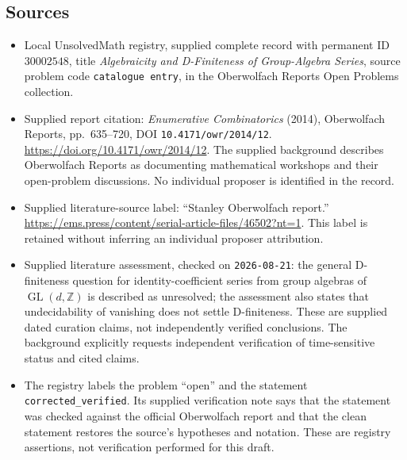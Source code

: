 \documentclass[11pt]{article}
\newcommand{\Z}{\mathbb{Z}}
\begin{document}
\subsection{Sources}
\begin{itemize}
\item Local UnsolvedMath registry, supplied complete record with permanent ID \(30002548\), title \emph{Algebraicity and D-Finiteness of Group-Algebra Series}, source problem code \texttt{catalogue entry}, in the Oberwolfach Reports Open Problems collection.
\item Supplied report citation: \emph{Enumerative Combinatorics} (2014), Oberwolfach Reports, pp.~635--720, DOI \texttt{10.4171/owr/2014/12}. \url{https://doi.org/10.4171/owr/2014/12}. The supplied background describes Oberwolfach Reports as documenting mathematical workshops and their open-problem discussions. No individual proposer is identified in the record.
\item Supplied literature-source label: ``Stanley Oberwolfach report.'' \url{https://ems.press/content/serial-article-files/46502?nt=1}. This label is retained without inferring an individual proposer attribution.
\item Supplied literature assessment, checked on \texttt{2026-08-21}: the general D-finiteness question for identity-coefficient series from group algebras of \(\operatorname{GL}(d,\Z)\) is described as unresolved; the assessment also states that undecidability of vanishing does not settle D-finiteness. These are supplied dated curation claims, not independently verified conclusions. The background explicitly requests independent verification of time-sensitive status and cited claims.
\item The registry labels the problem ``open'' and the statement \texttt{corrected\_verified}. Its supplied verification note says that the statement was checked against the official Oberwolfach report and that the clean statement restores the source's hypotheses and notation. These are registry assertions, not verification performed for this draft.
\end{itemize}
\end{document}
